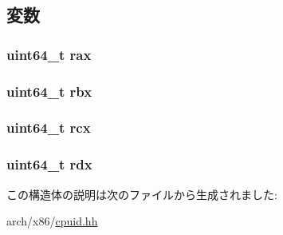 \subsection{変数}
\hypertarget{structX86ISA_1_1CpuidResult_afae317c0ec04889d6c9452dc30711975}{
\subsubsection[{rax}]{\setlength{\rightskip}{0pt plus 5cm}uint64\_\-t {\bf rax}}}
\label{structX86ISA_1_1CpuidResult_afae317c0ec04889d6c9452dc30711975}
\hypertarget{structX86ISA_1_1CpuidResult_a49647568f68fbd9082c6be345350f483}{
\subsubsection[{rbx}]{\setlength{\rightskip}{0pt plus 5cm}uint64\_\-t {\bf rbx}}}
\label{structX86ISA_1_1CpuidResult_a49647568f68fbd9082c6be345350f483}
\hypertarget{structX86ISA_1_1CpuidResult_a914f17516921c8917ca4a809893138d6}{
\subsubsection[{rcx}]{\setlength{\rightskip}{0pt plus 5cm}uint64\_\-t {\bf rcx}}}
\label{structX86ISA_1_1CpuidResult_a914f17516921c8917ca4a809893138d6}
\hypertarget{structX86ISA_1_1CpuidResult_a7e87c5e2faab8a404c01084ddeed4588}{
\subsubsection[{rdx}]{\setlength{\rightskip}{0pt plus 5cm}uint64\_\-t {\bf rdx}}}
\label{structX86ISA_1_1CpuidResult_a7e87c5e2faab8a404c01084ddeed4588}


この構造体の説明は次のファイルから生成されました:\begin{DoxyCompactItemize}
\item 
arch/x86/\hyperlink{cpuid_8hh}{cpuid.hh}\end{DoxyCompactItemize}
